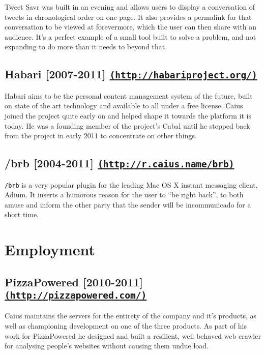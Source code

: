 \documentclass[letterpaper]{article}
\begin{document}
Tweet Savr was built in an evening and allows users to display a conversation of tweets in chronological order on one page. It also provides a permalink for that conversation to be viewed at forevermore, which the user can then share with an audience. It's a perfect example of a small tool built to solve a problem, and not expanding to do more than it needs to beyond that.


\subsection*{Habari [2007-2011] \href{http://habariproject.org/}{\tt (http://habariproject.org/)}} %
\label{sub:habari}

Habari aims to be the personal content management system of the future, built on state of the art technology and available to all under a free license. Caius joined the project quite early on and helped shape it towards the platform it is today. He was a founding member of the project's Cabal until he stepped back from the project in early 2011 to concentrate on other things.


\subsection*{/brb [2004-2011] \href{http://r.caius.name/brb}{\tt (http://r.caius.name/brb)}} %
\label{sub:brb}

{\tt /brb} is a very popular plugin for the leading Mac OS X instant messaging client, Adium. It inserts a humorous reason for the user to ``be right back'', to both amuse and inform the other party that the sender will be incommunicado for a short time.


\section*{Employment}

\subsection*{PizzaPowered [2010-2011] \href{http://pizzapowered.com/}{\tt (http://pizzapowered.com/)}} %
\label{sub:pizzapowered}

Caius maintains the servers for the entirety of the company and it's products, as well as championing development on one of the three products. As part of his work for PizzaPowered he designed and built a resilient, well behaved web crawler for analysing people's websites without causing them undue load.
\end{document}
